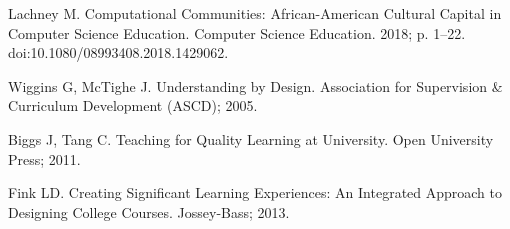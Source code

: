 \documentclass[10pt,letterpaper]{article}
\begin{document}
\begin{thebibliography}{10}
Lachney M.
\newblock Computational Communities: {African-American} Cultural Capital in
  Computer Science Education.
\newblock Computer Science Education. 2018; p. 1--22.
\newblock doi:{10.1080/08993408.2018.1429062}.

Wiggins G, McTighe J.
\newblock Understanding by Design.
\newblock Association for Supervision \& Curriculum Development ({ASCD}); 2005.

Biggs J, Tang C.
\newblock Teaching for Quality Learning at University.
\newblock Open University Press; 2011.

Fink LD.
\newblock Creating Significant Learning Experiences: An Integrated Approach to
  Designing College Courses.
\newblock Jossey-Bass; 2013.

\end{thebibliography}
\end{document}
